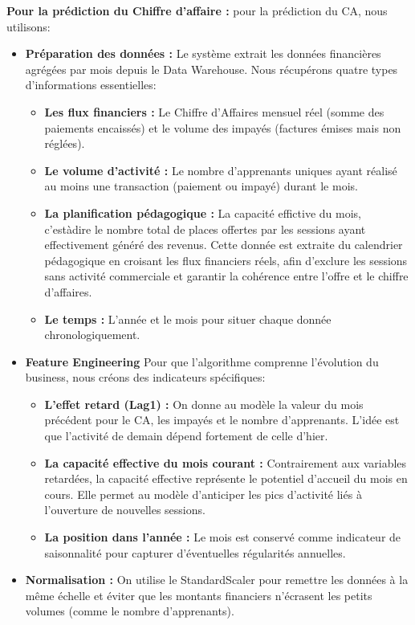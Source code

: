  
\noindent\textbf{Pour la prédiction du Chiffre d'affaire :} pour la prédiction du CA, nous utilisons:
\begin{itemize}
\item \textbf{Préparation des données :}
Le système extrait les données financières agrégées par mois depuis le Data Warehouse. Nous récupérons quatre types d'informations essentielles:
\begin{itemize}[label=\textbullet]
\item\textbf{Les flux financiers :} Le Chiffre d'Affaires mensuel réel (somme des paiements encaissés) et le volume des impayés (factures émises mais non réglées).
\item\textbf{Le volume d'activité :} Le nombre d'apprenants uniques ayant réalisé au moins une transaction (paiement ou impayé) durant le mois.
\item\textbf{La planification pédagogique :} La capacité effictive du mois, c'est\-à\-dire le nombre total de places offertes par les sessions ayant effectivement généré des revenus. Cette donnée est extraite du calendrier pédagogique en croisant les flux financiers réels, afin d'exclure les sessions sans activité commerciale et garantir la cohérence entre l'offre et le chiffre d'affaires.
\item\textbf{Le temps :} L'année et le mois pour situer chaque donnée chronologiquement.
\end{itemize}
\item \textbf{Feature Engineering}
Pour que l'algorithme comprenne l'évolution du business, nous créons des indicateurs spécifiques:
\begin{itemize}[label=\textbullet]
\item \textbf{L'effet retard (Lag1) :} On donne au modèle la valeur du mois précédent pour le CA, les impayés et le nombre d'apprenants. L'idée est que l'activité de demain dépend fortement de celle d'hier.
\item \textbf{La capacité effective du mois courant :} Contrairement aux variables retardées, la capacité effective représente le potentiel d'accueil du mois en cours. Elle permet au modèle d'anticiper les pics d'activité liés à l'ouverture de nouvelles sessions.
\item \textbf{La position dans l'année :} Le mois est conservé comme indicateur de saisonnalité pour capturer d'éventuelles régularités annuelles.
\end{itemize}
\item \textbf{Normalisation :} On utilise le StandardScaler pour remettre les données à la même échelle et éviter que les montants financiers n'écrasent les petits volumes (comme le nombre d'apprenants).

\end{itemize}
